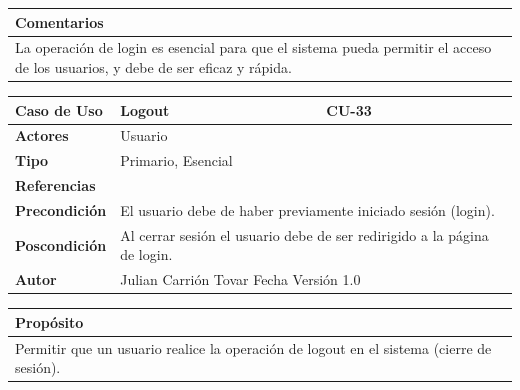\vspace{0.2cm}

\begin{table}[h!]
\centering
\begin{tabularx}{\textwidth}{|X|}
\hline
\cellcolor[HTML]{F2F2F2}\textbf{Comentarios} \\ \hline
La operación de login es esencial para que el sistema pueda permitir el acceso de los usuarios, y debe de ser eficaz y rápida. \\ \hline
\end{tabularx}
\end{table}


\clearpage

\begin{table}[h!]
\centering
\begin{tabularx}{\textwidth}{|p{3cm}|p{8cm}|p{2cm}|}
\hline
\textbf{Caso de Uso} & Logout & CU-33 \\ \hline
\textbf{Actores} & \multicolumn{2}{p{12cm}|}{Usuario} \\ \hline
\textbf{Tipo} & \multicolumn{2}{p{12cm}|}{Primario, Esencial} \\ \hline
\textbf{Referencias} & \multicolumn{2}{p{12cm}|}{} \\ \hline
\textbf{Precondición} & \multicolumn{2}{p{12cm}|}{El usuario debe de haber previamente iniciado sesión (login).} \\ \hline
\textbf{Poscondición} & \multicolumn{2}{p{12cm}|}{Al cerrar sesión el usuario debe de ser redirigido a la página de login.} \\ \hline
\textbf{Autor} & \multicolumn{2}{p{10cm}|}{Julian Carrión Tovar \hfill Fecha \hfill Versión 1.0} \\ \hline
\end{tabularx}
\end{table}

\vspace{0.2cm}

\begin{table}[h!]
\centering
\begin{tabularx}{\textwidth}{|X|}
\hline
\cellcolor[HTML]{F2F2F2}\textbf{Propósito} \\ \hline
Permitir que un usuario realice la operación de logout en el sistema (cierre de sesión). \\ \hline
\end{tabularx}
\end{table}

